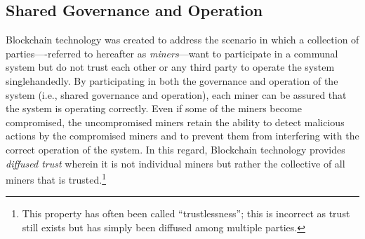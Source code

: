 \subsection{Shared Governance and Operation}
\label{sec:sharedgov}


Blockchain technology was created to address the scenario in which a collection of parties----referred to hereafter as \emph{miners}---want to participate in a communal system but do not trust each other or any third party to operate the system singlehandedly.
By participating in both the governance and operation of the system (i.e., shared governance and operation), each miner can be assured that the system is operating correctly.
Even if some of the miners become compromised, the uncompromised miners retain the ability to detect malicious actions by the compromised miners and to prevent them from interfering with the correct operation of the system.
In this regard, Blockchain technology provides \emph{diffused trust} wherein it is not individual miners but rather the collective of all miners that is trusted.\footnote{This property has often been called ``trustlessness''; this is incorrect as trust still exists but has simply been diffused among multiple parties.}

